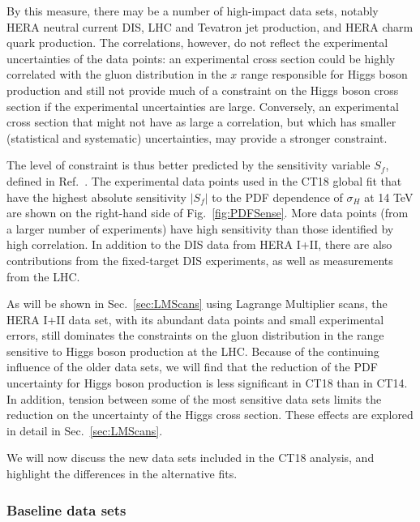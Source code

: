 By this measure, there may be a number of high-impact data sets, notably HERA neutral current DIS, LHC and Tevatron jet production, and HERA charm quark production.
The correlations, however, do not reflect the experimental uncertainties of the data points: an experimental cross section could be highly correlated with the gluon distribution in the $x$ range  responsible for Higgs boson production and still not provide much of a constraint
on the Higgs boson cross section if the experimental uncertainties are large. Conversely, an experimental cross section that might not have as large a correlation, but which has smaller (statistical and systematic) uncertainties,
may provide a stronger
constraint. 

The level of constraint is thus better predicted by the sensitivity variable $S_f$, defined in Ref.~\cite{Wang:2018heo}. The experimental data points used in the CT18 global fit that have the
highest absolute sensitivity $|S_f|$ to the PDF dependence of $\sigma_H$ at 14 TeV are shown on the right-hand side of Fig.~\ref{fig:PDFSense}. More data points (from a larger number of experiments) have high sensitivity
than those identified by high correlation. In addition to the DIS data from HERA I+II, there are also contributions from the fixed-target DIS experiments, as well as measurements from the LHC. 

As will be shown in Sec.~\ref{sec:LMScans} using Lagrange Multiplier scans, the HERA I+II data set, with its abundant data points and small experimental errors, 
still dominates the constraints on the gluon distribution in the range sensitive to Higgs boson production at the LHC. 
Because of the continuing influence of the older data sets, we will find that the reduction of the PDF uncertainty for Higgs boson production is less significant in CT18 than in CT14. In addition, tension between some of the most sensitive data sets limits the reduction on the uncertainty
of the Higgs cross section. These effects are explored in detail in Sec.~\ref{sec:LMScans}.

We will now discuss the new data sets included in the CT18 analysis, and highlight the differences in the alternative fits.


\subsubsection{Baseline data sets \label{sec:Baseline}}

